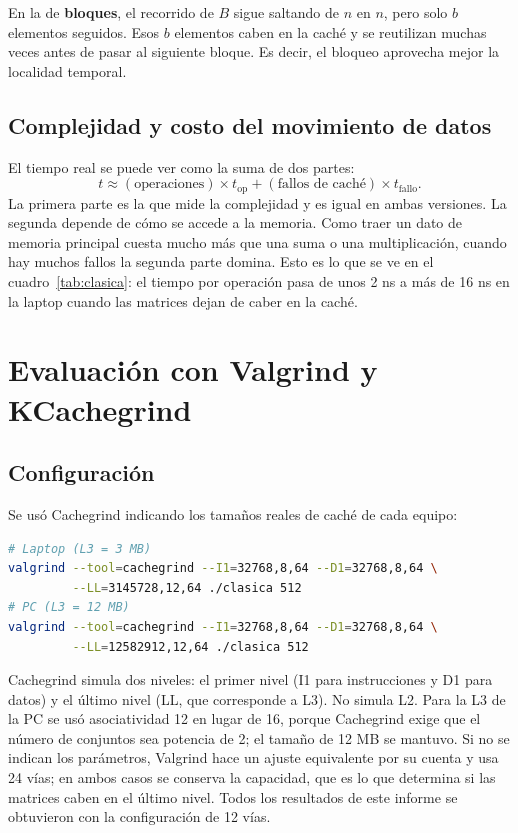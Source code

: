 \documentclass[11pt]{article}
\begin{document}
En la de \textbf{bloques}, el recorrido de $B$ sigue saltando de $n$ en $n$,
pero solo $b$ elementos seguidos. Esos $b$ elementos caben en la caché y se
reutilizan muchas veces antes de pasar al siguiente bloque. Es decir, el
bloqueo aprovecha mejor la localidad temporal.

\subsection{Complejidad y costo del movimiento de datos}

El tiempo real se puede ver como la suma de dos partes:
\[
t \approx (\text{operaciones}) \times t_{\text{op}} + (\text{fallos de caché}) \times t_{\text{fallo}}.
\]
La primera parte es la que mide la complejidad y es igual en ambas
versiones. La segunda depende de cómo se accede a la memoria. Como traer un
dato de memoria principal cuesta mucho más que una suma o una
multiplicación, cuando hay muchos fallos la segunda parte domina. Esto es
lo que se ve en el cuadro~\ref{tab:clasica}: el tiempo por operación pasa de
unos 2 ns a más de 16 ns en la laptop cuando las matrices dejan de caber en
la caché.

\section{Evaluación con Valgrind y KCachegrind}
\label{sec:valgrind}

\subsection{Configuración}

Se usó Cachegrind indicando los tamaños reales de caché de cada equipo:

\begin{lstlisting}[language=bash,numbers=none,caption={Comandos usados (\texttt{cachegrind.sh}).}]
# Laptop (L3 = 3 MB)
valgrind --tool=cachegrind --I1=32768,8,64 --D1=32768,8,64 \
         --LL=3145728,12,64 ./clasica 512
# PC (L3 = 12 MB)
valgrind --tool=cachegrind --I1=32768,8,64 --D1=32768,8,64 \
         --LL=12582912,12,64 ./clasica 512
\end{lstlisting}

Cachegrind simula dos niveles: el primer nivel (I1 para instrucciones y D1
para datos) y el último nivel (LL, que corresponde a L3). No simula L2.
Para la L3 de la PC se usó asociatividad 12 en lugar de 16, porque
Cachegrind exige que el número de conjuntos sea potencia de 2; el tamaño
de 12 MB se mantuvo. Si no se indican los parámetros, Valgrind hace un ajuste
equivalente por su cuenta y usa 24 vías; en ambos casos se conserva la
capacidad, que es lo que determina si las matrices caben en el último nivel.
Todos los resultados de este informe se obtuvieron con la configuración de
12 vías.
\end{document}
